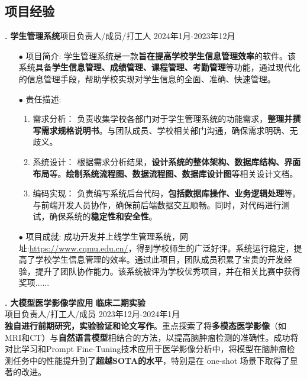 \documentclass[10pt]{article}
\begin{document}
    
    \subsection{\Large 项目经验}
    \textbf{\uppercase\expandafter{}.} \textbf{学生管理系统}\hspace{1em}项目负责人/成员/打工人
     \hfill 2024年1月-2023年12月

    
    \begin{itemize}[itemsep=1pt, leftmargin=2em]
        \item[\Large $\bullet$] \small 项目简介: 学生管理系统是一款\textbf{旨在提高学校学生信息管理效率}的软件。该系统具备\textbf{学生信息管理、成绩管理、课程管理、考勤管理}等功能，通过现代化的信息管理手段，帮助学校实现对学生信息的全面、准确、快速管理。
        \item[\Large $\bullet$] \small 责任描述: 
        \begin{enumerate}
            \item 需求分析： 负责收集学校各部门对于学生管理系统的功能需求，\textbf{整理并撰写需求规格说明书}。与团队成员、学校相关部门沟通，确保需求明确、无歧义。
            \item 系统设计： 根据需求分析结果，\textbf{设计系统的整体架构、数据库结构、界面布局}等。\textbf{绘制系统流程图、数据流程图、数据库设计图}等相关设计文档。
            \item 编码实现：  负责编写系统后台代码，\textbf{包括数据库操作、业务逻辑处理}等。与前端开发人员协作，确保前后端数据交互顺畅。同时，对代码进行测试，确保系统的\textbf{稳定性和安全性}。
        \end{enumerate}
        \item[\Large $\bullet$] \small 项目成就: 成功开发并上线学生管理系统，网址:\hyperlink{cqmu}{https://www.cqmu.edu.cn/}，得到学校师生的广泛好评。系统运行稳定，提高了学校学生信息管理的效率。通过此项目，团队成员积累了宝贵的开发经验，提升了团队协作能力。该系统被评为学校优秀项目，并在相关比赛中获得奖项......

    \end{itemize}

    \vspace{1em}
    \textbf{\uppercase\expandafter{}.} \textbf{大模型医学影像学应用} \hfill \textbf{临床二期实验} \\
    项目负责人/打工人/成员 \hfill 2023年12月-2024年1月\\
    \textbf{独自进行前期研究，实验验证和论文写作}。重点探索了将\textbf{多模态医学影像}（如MRI和CT）与\textbf{自然语言模型}相结合的方法，以提高脑肿瘤检测的准确性。成功将对比学习和Prompt Fine-Tuning技术应用于医学影像分析中，将模型在脑肿瘤检测任务中的性能提升到了\textbf{超越SOTA的水平}，特别是在 one-shot 场景下取得了显著的改进。
\end{document}
